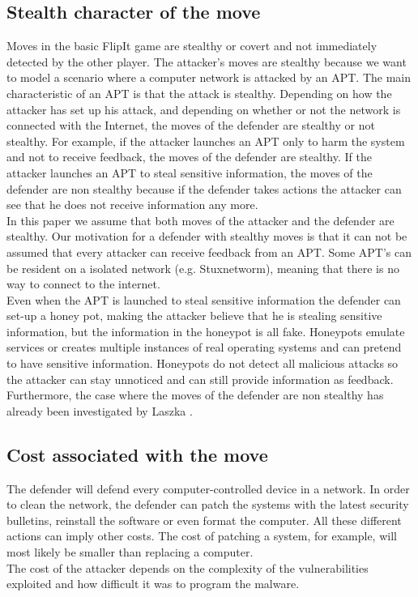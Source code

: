 \subsection{Stealth character of the move}
Moves in the basic FlipIt game are stealthy or covert and not immediately detected by the other player. The attacker's moves are stealthy because we want to model a scenario where a computer network is attacked by an APT. The main characteristic of an APT is that the attack is stealthy. Depending on how the attacker has set up his attack, and depending on whether or not the network is connected with the Internet, the moves of the defender are stealthy or not stealthy. For example, if the attacker launches an APT only to harm the system and not to receive feedback, the moves of the defender are stealthy. If the attacker launches an APT to steal sensitive information, the moves of the defender are non stealthy because if the defender takes actions the attacker can see that he does not receive information any more. \\
In this paper we assume that both moves of the attacker and the defender are stealthy. Our motivation for a defender with stealthy moves is that it can not be assumed that every attacker can receive feedback from an APT. Some APT's can be resident on a isolated network (e.g. Stuxnetworm), meaning that there is no way to connect to the internet. \\
Even when the APT is launched to steal sensitive information the defender can set-up a honey pot, making the attacker believe that he is stealing sensitive information, but the information in the honeypot is all fake. Honeypots emulate services or creates multiple instances of real operating systems and can pretend to have sensitive information.  Honeypots do not detect all malicious attacks so the attacker can stay unnoticed and can still provide information as feedback. Furthermore, the case where the moves of the defender are non stealthy has already been investigated by Laszka \citep{MitigationNonTargeted}.


  
\subsection{Cost associated with the move}
 The defender will defend every computer-controlled device in a network. In order to clean the network, the defender can patch the systems with the latest security bulletins, reinstall the software or even format the computer. All these different actions can imply other costs. The cost of patching a system, for example, will most likely be smaller than replacing a computer. \\ 
The cost of the attacker depends on the complexity of the vulnerabilities exploited and how difficult it was to program the malware.
